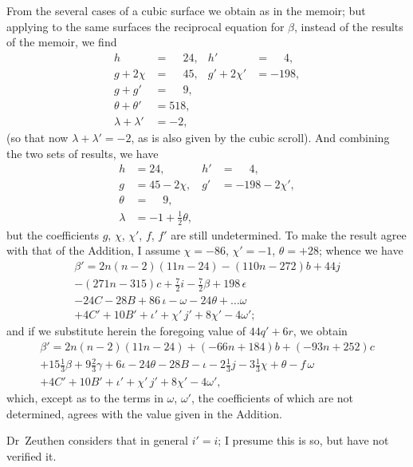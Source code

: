 \documentclass[11pt,a4paper]{article}
\theoremstyle{plain}
\theoremstyle{definition}
\theoremstyle{remark}
\begin{document}
From the several cases of a cubic surface we obtain as in the memoir; but applying to the same surfaces the reciprocal equation for $\beta$, instead of the results of the memoir, we find
\begin{align*}
h &= \phantom{-}24, & h' &= \phantom{-}4,\\
g+2\chi &= \phantom{-}45, & g'+2\chi' &= -198,\\
g+g' &= \phantom{-}9,\\
\theta+\theta' &= 518,\\
\lambda+\lambda' &= -2,
\end{align*}
(so that now $\lambda+\lambda'=-2$, as is also given by the cubic scroll). And combining the two sets of results, we have
\begin{align*}
h &= 24, & h' &= \phantom{-}4,\\
g &= 45-2\chi, & g' &= -198-2\chi',\\
\theta &= \phantom{-}9,\\
\lambda &= -1+\tfrac{1}{2}\theta,
\end{align*}
but the coefficients $g$, $\chi$, $\chi'$, $f$, $f'$ are still undetermined. To make the result agree with that of the Addition, I assume $\chi=-86$, $\chi'=-1$, $\theta=+28$; whence we have
\begin{multline*}
\beta'=2n(n-2)(11n-24)-(110n-272)b+44j\\
-(271n-315)c+\tfrac{7}{2}i-\tfrac{7}{2}\beta+198\,\epsilon\\
-24C-28B+86\,\iota-\omega-24\theta+\ldots\omega\\
+4C'+10B'+\iota'+\chi'\,j'+8\chi'-4\omega';
\end{multline*}
and if we substitute herein the foregoing value of $44q'+6r$, we obtain
\begin{multline*}
\beta'=2n(n-2)(11n-24)+(-66n+184)b+(-93n+252)c\\
+15\tfrac{1}{3}\beta+9\tfrac{2}{3}\gamma+6\iota-24\theta-28B-\iota-2\tfrac{1}{3}j-3\tfrac{1}{3}\chi+\theta-f\,\omega\\
+4C'+10B'+\iota'+\chi'\,j'+8\chi'-4\omega',
\end{multline*}
which, except as to the terms in $\omega$, $\omega'$, the coefficients of which are not determined, agrees with the value given in the Addition.

Dr~Zeuthen considers that in general $i'=i$; I presume this is so, but have not verified it.

\newpage
\setcounter{page}{610}

\end{document}
